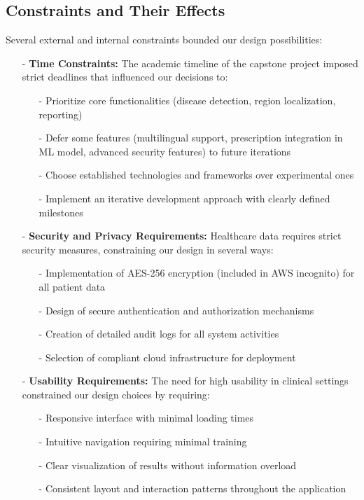 \documentclass{article}
\begin{document}
\subsection{Constraints and Their Effects}

Several external and internal constraints bounded our design possibilities:

\begin{itemize}
    \item[-] \textbf{Time Constraints:} The academic timeline of the capstone project imposed strict deadlines that influenced our decisions to:
    \begin{itemize}
        \item[-] Prioritize core functionalities (disease detection, region localization, reporting)
        \item[-] Defer some features (multilingual support, prescription integration in ML model, advanced security features) to future iterations
        \item[-] Choose established technologies and frameworks over experimental ones
        \item[-] Implement an iterative development approach with clearly defined milestones
    \end{itemize}
    
    \item[-] \textbf{Security and Privacy Requirements:} Healthcare data requires strict security measures, constraining our design in several ways:
    \begin{itemize}
        \item[-] Implementation of AES-256 encryption (included in AWS incognito) for all patient data
        \item[-] Design of secure authentication and authorization mechanisms
        \item[-] Creation of detailed audit logs for all system activities
        \item[-] Selection of compliant cloud infrastructure for deployment
    \end{itemize}
    
    \item[-] \textbf{Usability Requirements:} The need for high usability in clinical settings constrained our design choices by requiring:
    \begin{itemize}
        \item[-] Responsive interface with minimal loading times
        \item[-] Intuitive navigation requiring minimal training
        \item[-] Clear visualization of results without information overload
        \item[-] Consistent layout and interaction patterns throughout the application
    \end{itemize}
\end{itemize}
\end{document}

